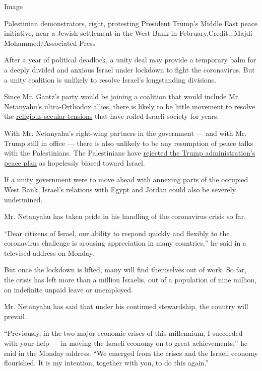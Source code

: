 Image

Palestinian demonstrators, right, protesting President Trump's Middle
East peace initiative, near a Jewish settlement in the West Bank in
February.Credit...Majdi Mohammed/Associated Press

After a year of political deadlock, a unity deal may provide a temporary
balm for a deeply divided and anxious Israel under lockdown to fight the
coronavirus. But a unity coalition is unlikely to resolve Israel's
longstanding divisions.

Since Mr. Gantz's party would be joining a coalition that would include
Mr. Netanyahu's ultra-Orthodox allies, there is likely to be little
movement to resolve the
\href{https://www.nytimes.com/2019/09/12/world/middleeast/israeli-election-religious-secular.html?searchResultPosition=4}{religious-secular
tensions} that have roiled Israeli society for years.

With Mr. Netanyahu's right-wing partners in the government --- and with
Mr. Trump still in office --- there is also unlikely to be any
resumption of peace talks with the Palestinians. The Palestinians have
\href{https://www.nytimes.com/2020/02/11/world/middleeast/palestinian-trump-plan-UN.html}{rejected
the Trump administration's peace plan} as hopelessly biased toward
Israel.

If a unity government were to move ahead with annexing parts of the
occupied West Bank, Israel's relations with Egypt and Jordan could also
be severely undermined.

Mr. Netanyahu has taken pride in his handling of the coronavirus crisis
so far.

``Dear citizens of Israel, our ability to respond quickly and flexibly
to the coronavirus challenge is arousing appreciation in many
countries,'' he said in a televised address on Monday.

But once the lockdown is lifted, many will find themselves out of work.
So far, the crisis has left more than a million Israelis, out of a
population of nine million, on indefinite unpaid leave or unemployed.

Mr. Netanyahu has said that under his continued stewardship, the country
will prevail.

``Previously, in the two major economic crises of this millennium, I
succeeded --- with your help --- in moving the Israeli economy on to
great achievements,'' he said in the Monday address. ``We emerged from
the crises and the Israeli economy flourished. It is my intention,
together with you, to do this again.''

